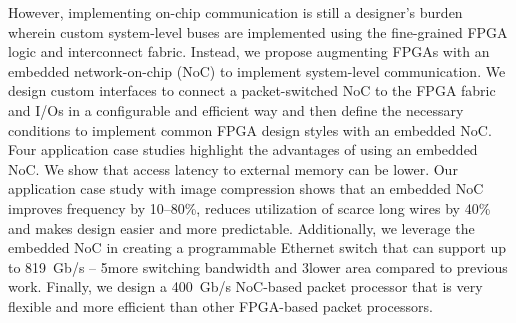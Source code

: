 However, implementing on-chip communication is still a designer's burden wherein custom system-level buses are implemented using the fine-grained FPGA logic and interconnect fabric.
Instead, we propose augmenting FPGAs with an embedded network-on-chip (NoC) to implement system-level communication.
We design custom interfaces to connect a packet-switched NoC to the FPGA fabric and I/Os in a configurable and efficient way and then define the necessary conditions to implement common FPGA design styles with an embedded NoC.
Four application case studies highlight the advantages of using an embedded NoC.
We show that access latency to external memory can be \xx lower.
Our application case study with image compression shows that an embedded NoC improves frequency by 10--80\%, reduces utilization of scarce long wires by 40\% and makes design easier and more predictable.
Additionally, we leverage the embedded NoC in creating a programmable Ethernet switch that can support up to 819~Gb/s -- 5\xx more switching bandwidth and 3\xx lower area compared to previous work.
Finally, we design a 400~Gb/s NoC-based packet processor that is very flexible and more efficient than other FPGA-based packet processors.
%
